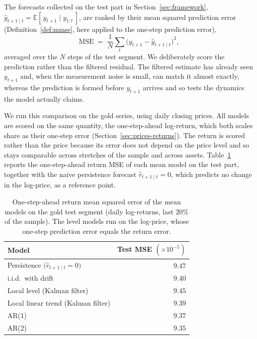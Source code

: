 The forecasts collected on the test part in Section~\ref{sec:framework}, $\hat{y}_{t+1 \mid t} = \mathbb{E}[\,y_{t+1} \mid y_{1:t}\,]$, are ranked by their mean squared prediction error (Definition~\ref{def:mmse}, here applied to the one-step prediction error),
\begin{equation}\label{eq:mse}
  \mathrm{MSE} \;=\; \frac{1}{N}\sum_{t} \bigl(y_{t+1} - \hat{y}_{t+1 \mid t}\bigr)^2 ,
\end{equation}
averaged over the $N$ steps of the test segment. We deliberately score the prediction rather than the filtered residual. The filtered estimate has already seen $y_{t+1}$ and, when the measurement noise is small, can match it almost exactly, whereas the prediction is formed before $y_{t+1}$ arrives and so tests the dynamics the model actually claims.

We run this comparison on the gold series, using daily closing prices. All models are scored on the same quantity, the one-step-ahead log-return, which both scales share as their one-step error (Section~\ref{sec:prices-returns}). The return is scored rather than the price because its error does not depend on the price level and so stays comparable across stretches of the sample and across assets. Table~\ref{tab:mean-mse} reports the one-step-ahead return MSE of each mean model on the test part, together with the naive persistence forecast $\hat{r}_{t+1\mid t}=0$, which predicts no change in the log-price, as a reference point.

\begin{table}
\centering
\begin{tabular}{lr}
\hline
Model & Test MSE $(\times 10^{-5})$ \\
\hline
Persistence $\bigl(\hat{r}_{t+1\mid t}=0\bigr)$ & $9.47$ \\
i.i.d.\ with drift & $9.40$ \\
Local level (Kalman filter) & $9.45$ \\
Local linear trend (Kalman filter) & $9.39$ \\
AR(1) & $9.37$ \\
AR(2) & $9.35$ \\
\hline
\end{tabular}
\caption{One-step-ahead return mean squared error of the mean models on the gold
test segment (daily log-returns, last $20\%$ of the sample). The level models run
on the log-price, whose one-step prediction error equals the return error.}
\label{tab:mean-mse}
\end{table}

